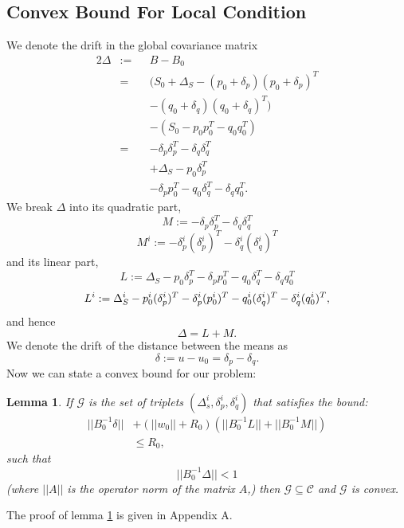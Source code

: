 \documentclass{sig-alternate-05-2015}
\newtheorem{lemma}{Lemma}
\begin{document}
\subsection{Convex Bound For Local Condition}
We denote the drift in the global covariance matrix
\begin{alignat*}{2}
\Delta & := && B-B_0 \\
& = && (S_0+\Delta_S - (p_0+\delta_p)(p_0+\delta_p)^T \\
& && - (q_0+\delta_q)(q_0+\delta_q)^T) \\
& && - (S_0 - p_0p_0^T - q_0q_0^T) \\
& = && - \delta_p\delta_p^T - \delta_q\delta_q^T \\
& && + \Delta_S - p_0\delta_p^T \\
& && - \delta_pp_0^T - q_0\delta_q^T - \delta_qq_0^T.
\end{alignat*}
We break $\Delta$ into its quadratic part,
\begin{equation*}
M:= - \delta_p\delta_p^T - \delta_q\delta_q^T
\end{equation*}
\begin{equation*}
M^i:= - \delta_p^i(\delta_p^i)^T - \delta_q^i(\delta_q^i)^T
\end{equation*}
and its linear part,
\begin{equation*}
L:= \Delta_S - p_0\delta_p^T - \delta_pp_0^T - q_0\delta_q^T - \delta_qq_0^T
\end{equation*}
\begin{equation*}
\\ L^i := \Delta_S^i - p_0^i(\delta_p^i)^T - \delta_p^i(p_0^i)^T -
q_0^i(\delta_q^i)^T - \delta_q^i(q_0^i)^T,
\end{equation*}
and hence
\begin{equation*}
\Delta= L+ M.
\end{equation*}
We denote the drift of the distance between the means as
\begin{equation*}
\delta:= u-u_0 = \delta_p - \delta_q.
\end{equation*}
Now we can state a convex bound for our problem:
\begin{lemma} \label{convexBound}
If $\mathcal{G}$ is the set of triplets $(\Delta_s^i, \delta_p^i, \delta_q^i)$
 that satisfies the bound:
 \begin{equation} \label{eq:convexBound}
\begin{split}
||B_0^{-1}\delta|| &+ (||w_0||+R_0)(||B_0^{-1}L||+||B_0^{-1}M||) \\ & \leq  R_0,
\end{split}
\end{equation}
such that
 \begin{equation*}
||B_0^{-1}\Delta|| < 1
\end{equation*}
 (where $||A||$ is the operator norm of the matrix $A$,) then $\mathcal{G}\subseteq \mathcal{C}$ and $\mathcal{G}$ is convex.
\end{lemma}
The proof of lemma \ref{convexBound} is given in Appendix A.
\end{document}
